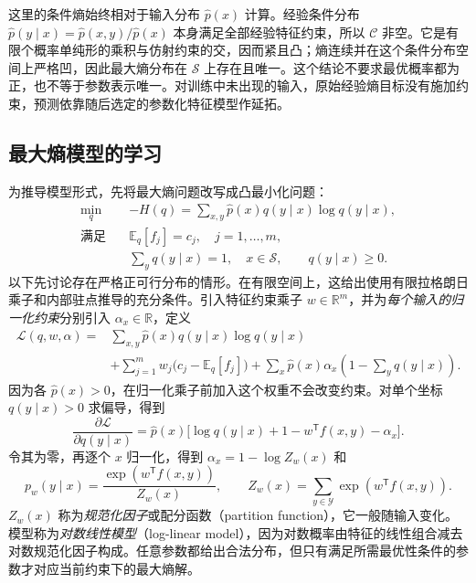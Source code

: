 这里的条件熵始终相对于输入分布 $\widehat p(x)$ 计算。经验条件分布 $\widehat p(y\mid x)=\widehat p(x,y)/\widehat p(x)$ 本身满足全部经验特征约束，所以 $\mathcal C$ 非空。它是有限个概率单纯形的乘积与仿射约束的交，因而紧且凸；熵连续并在这个条件分布空间上严格凹，因此最大熵分布在 $\mathcal S$ 上存在且唯一。这个结论不要求最优概率都为正，也不等于参数表示唯一。对训练中未出现的输入，原始经验熵目标没有施加约束，预测依靠随后选定的参数化特征模型作延拓。

\subsection{最大熵模型的学习}
\label{subsec:lh-maxent-learning}

为推导模型形式，先将最大熵问题改写成凸最小化问题：
\begin{equation}
\begin{aligned}
\min_{q}\quad&-H(q)=\sum_{x,y}\widehat p(x)q(y\mid x)\log q(y\mid x),\\
\text{满足}\quad&\mathbb E_q[f_j]=c_j,\quad j=1,\ldots,m,\\
&\sum_yq(y\mid x)=1,\quad x\in\mathcal S,\qquad q(y\mid x)\geq0.
\end{aligned}
\label{eq:lh-maxent-primal}
\end{equation}
以下先讨论存在严格正可行分布的情形。在有限空间上，这给出使用有限拉格朗日乘子和内部驻点推导的充分条件。引入特征约束乘子 $w\in\mathbb R^m$，并为\emph{每个输入的归一化约束}分别引入 $\alpha_x\in\mathbb R$，定义
\begin{equation}
\begin{aligned}
\mathscr L(q,w,\alpha)={}&\sum_{x,y}\widehat p(x)q(y\mid x)\log q(y\mid x)\\
&+\sum_{j=1}^mw_j\bigl(c_j-\mathbb E_q[f_j]\bigr)
+\sum_x\widehat p(x)\alpha_x\left(1-\sum_yq(y\mid x)\right).
\end{aligned}
\label{eq:lh-maxent-lagrangian}
\end{equation}
因为各 $\widehat p(x)>0$，在归一化乘子前加入这个权重不会改变约束。对单个坐标 $q(y\mid x)>0$ 求偏导，得到
\[
\frac{\partial\mathscr L}{\partial q(y\mid x)}
=\widehat p(x)\bigl[\log q(y\mid x)+1-w^{\mathsf T}f(x,y)-\alpha_x\bigr].
\]
令其为零，再逐个 $x$ 归一化，得到 $\alpha_x=1-\log Z_w(x)$ 和
\begin{equation}
p_w(y\mid x)=\frac{\exp(w^{\mathsf T}f(x,y))}{Z_w(x)},\qquad
Z_w(x)=\sum_{y\in\mathcal Y}\exp(w^{\mathsf T}f(x,y)).
\label{eq:lh-maxent-model}
\end{equation}
$Z_w(x)$ 称为\emph{规范化因子}或配分函数（partition function），它一般随输入变化。模型称为\emph{对数线性模型}（log-linear model），因为对数概率由特征的线性组合减去对数规范化因子构成。任意参数都给出合法分布，但只有满足所需最优性条件的参数才对应当前约束下的最大熵解。


